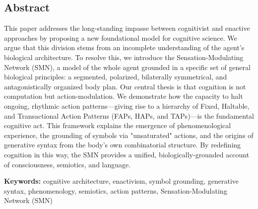 \subsection*{Abstract}
This paper addresses the long-standing impasse between cognitivist and enactive approaches by proposing a new foundational model for cognitive science. We argue that this division stems from an incomplete understanding of the agent's biological architecture. To resolve this, we introduce the Sensation-Modulating Network (SMN), a model of the whole agent grounded in a specific set of general biological principles: a segmented, polarized, bilaterally symmetrical, and antagonistically organized body plan. Our central thesis is that cognition is not computation but action-modulation. We demonstrate how the capacity to halt ongoing, rhythmic action patterns—giving rise to a hierarchy of Fixed, Haltable, and Transactional Action Patterns (FAPs, HAPs, and TAPs)—is the fundamental cognitive act. This framework explains the emergence of phenomenological experience, the grounding of symbols via "unsaturated" actions, and the origins of generative syntax from the body's own combinatorial structure. By redefining cognition in this way, the SMN provides a unified, biologically-grounded account of consciousness, semiotics, and language.

\bigskip
\noindent \textbf{Keywords:} cognitive architecture, enactivism, symbol grounding, generative syntax, phenomenology, semiotics, action patterns, Sensation-Modulating Network (SMN)